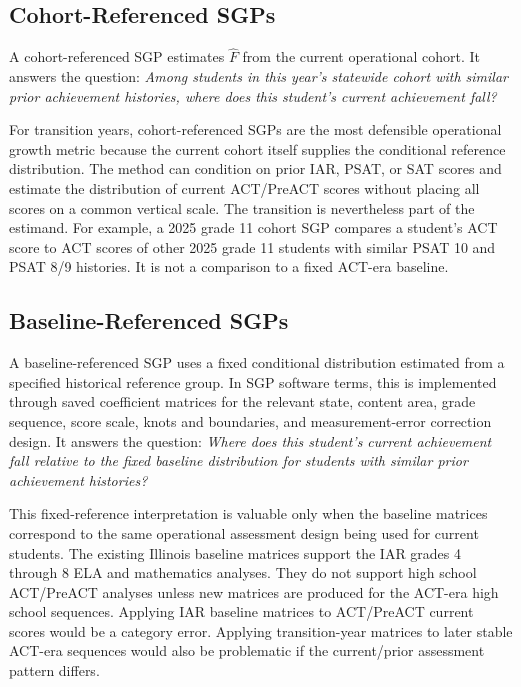 \documentclass[11pt]{article}
\begin{document}
\subsection{Cohort-Referenced SGPs}

A cohort-referenced SGP estimates \(\widehat{F}\) from the current operational cohort. It answers the question: \emph{Among students in this year's statewide cohort with similar prior achievement histories, where does this student's current achievement fall?}

For transition years, cohort-referenced SGPs are the most defensible operational growth metric because the current cohort itself supplies the conditional reference distribution. The method can condition on prior IAR, PSAT, or SAT scores and estimate the distribution of current ACT/PreACT scores without placing all scores on a common vertical scale. The transition is nevertheless part of the estimand. For example, a 2025 grade 11 cohort SGP compares a student's ACT score to ACT scores of other 2025 grade 11 students with similar PSAT 10 and PSAT 8/9 histories. It is not a comparison to a fixed ACT-era baseline.

\subsection{Baseline-Referenced SGPs}

A baseline-referenced SGP uses a fixed conditional distribution estimated from a specified historical reference group. In SGP software terms, this is implemented through saved coefficient matrices for the relevant state, content area, grade sequence, score scale, knots and boundaries, and measurement-error correction design. It answers the question: \emph{Where does this student's current achievement fall relative to the fixed baseline distribution for students with similar prior achievement histories?}

This fixed-reference interpretation is valuable only when the baseline matrices correspond to the same operational assessment design being used for current students. The existing Illinois baseline matrices support the IAR grades 4 through 8 ELA and mathematics analyses. They do not support high school ACT/PreACT analyses unless new matrices are produced for the ACT-era high school sequences. Applying IAR baseline matrices to ACT/PreACT current scores would be a category error. Applying transition-year matrices to later stable ACT-era sequences would also be problematic if the current/prior assessment pattern differs.
\end{document}
